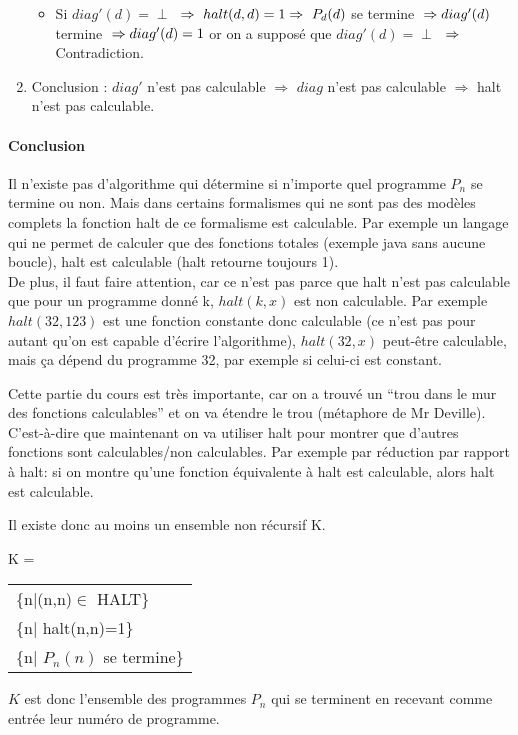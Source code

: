 \begin{enumerate}
\begin{itemize}
			\item Si $diag'(d)= \perp$ $\\
			\Rightarrow \  halt(d,d) = 1 \\
			\Rightarrow \ P_d(d)$ se termine $ \\
			\Rightarrow diag'(d)$ termine $ \\
			\Rightarrow diag'(d) = 1$ or on a supposé que $diag'(d) = \perp$ $ \\
			\Rightarrow $
			Contradiction.
		\end{itemize}
	\item Conclusion : $diag'$ n'est pas calculable $ \Rightarrow $ $diag$
	n'est pas calculable $ \Rightarrow $ halt n'est pas calculable.

\end{enumerate}

\paragraph{Conclusion} Il n'existe pas d'algorithme qui détermine si n'importe quel programme $P_n$ se termine ou non. Mais dans certains formalismes qui ne sont pas des modèles complets la fonction halt de ce formalisme est calculable.
Par exemple un langage qui ne permet de calculer
que des fonctions totales (exemple java sans aucune boucle), halt est calculable (halt retourne toujours 1). \\

De plus, il faut faire attention, car ce n'est pas parce que halt n'est pas calculable que pour un programme donné k, $halt(k,x)$ est non calculable. Par exemple $halt(32,123)$ est une fonction constante donc calculable (ce n'est pas pour autant qu'on est capable d'écrire l'algorithme), $halt(32,x)$ peut-être calculable, mais ça dépend du programme 32, par exemple si celui-ci est constant.

\begin{myrem}
	Cette partie du cours est très importante, car on a trouvé un ``trou dans le mur des fonctions calculables'' et on va étendre le trou (métaphore
	de Mr Deville). C'est-à-dire que maintenant on va utiliser halt pour montrer que d'autres fonctions sont calculables/non calculables. Par exemple	par réduction par rapport à halt: si on montre qu'une fonction équivalente à halt est calculable, alors halt est calculable.
\end{myrem}

Il existe donc au moins un ensemble non récursif
K.

\begin{mydef}[K]
	K =
	\begin{tabular}{l}
		\{n|(n,n)$\in$ HALT\}\\
		\{n| halt(n,n)=1\}\\
		\{n| $P_n(n)$ se termine\}
	\end{tabular}

	$K$ est donc l'ensemble des programmes $P_n$ qui se terminent en recevant comme entrée leur numéro de programme.
\end{mydef}

